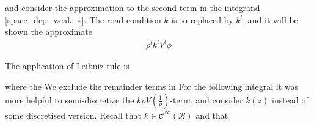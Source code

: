 and consider the approximation to the second term in the integrand \eqref{space_dep_weak_s}. The road condition $k$ is to replaced by $k^l$, and it will be shown the approximate 
\begin{align}
	\rho^l k^l V^l \phi 
\end{align}    

The application of Leibniz rule is 


where the 
We exclude the remainder terms in 
For the following integral it was more helpful to semi-discretize the $k\rho V(\frac{1}{\rho})$-term, and consider $k(z)$ instead of some discretised version. Recall that $k \in \mathscr{C}^{\infty}(\mathscr{R})$ and that 




